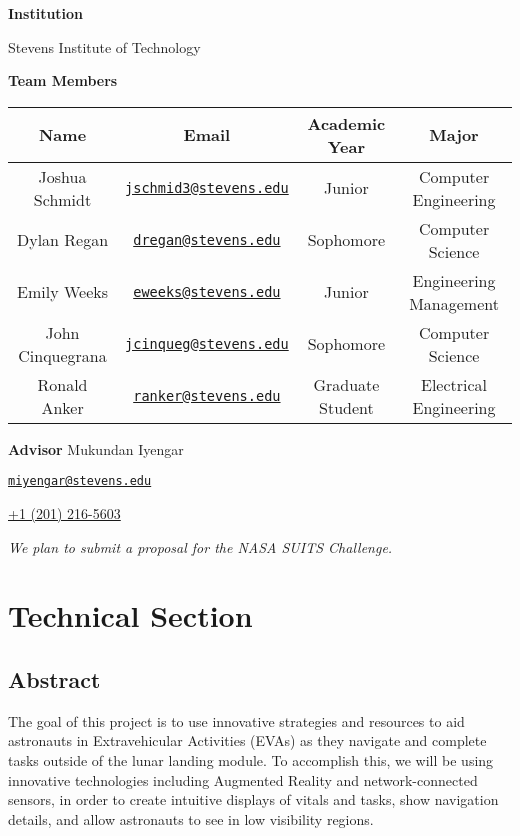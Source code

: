 \documentclass{article}
\let\Oldsection\section
\renewcommand{\section}{\FloatBarrier\Oldsection}
\let\Oldsubsection\subsection
\renewcommand{\subsection}{\FloatBarrier\Oldsubsection}
\newcommand{\schoolname}{Stevens Institute of Technology}
\begin{document}
\begin{center}

\bigskip
\bigskip
\textbf{Institution}

\schoolname

\bigskip

\textbf{Team Members}

\bigskip
\bigskip

\begin{tabular}{||c c c c||} 
 \hline
 Name & Email & Academic Year & Major \\ [0.5ex] 
 \hline\hline
 Joshua Schmidt & \href{mailto:jschmid3@stevens.edu}{\nolinkurl{jschmid3@stevens.edu}} & Junior & Computer Engineering \\ 
 \hline
 Dylan Regan & \href{mailto:dregan@stevens.edu}{\nolinkurl{dregan@stevens.edu}} & Sophomore & Computer Science \\
 \hline
 Emily Weeks & \href{mailto:jschmid3@stevens.edu}{\nolinkurl{eweeks@stevens.edu}} & Junior & Engineering Management\\
 \hline
 John Cinquegrana & \href{mailto:jcinqueg@stevens.edu}{\nolinkurl{jcinqueg@stevens.edu}} & Sophomore & Computer Science \\
 \hline
 Ronald Anker & \href{mailto:ranker@stevens.edu}{\nolinkurl{ranker@stevens.edu}} & Graduate Student & Electrical Engineering \\
 \hline
\end{tabular}

\bigskip
\bigskip

\textbf{Advisor}
\bigskip
Mukundan Iyengar

\href{mailto:miyengar@stevens.edu}{\nolinkurl{miyengar@stevens.edu}}

\href{tel:12012165603}{+1 (201) 216-5603}

\bigskip
\bigskip
\textit{We plan to submit a proposal for the NASA SUITS Challenge.}

\end{center}

\newpage

\section{Technical Section}

\subsection{Abstract}

The goal of this project is to use innovative strategies and resources to aid astronauts in Extravehicular Activities (EVAs) as they navigate and complete tasks outside of the lunar landing module. To accomplish this, we will be using innovative technologies including Augmented Reality and network-connected sensors, in order to create intuitive displays of vitals and tasks, show navigation details, and allow astronauts to see in low visibility regions.
\end{document}
